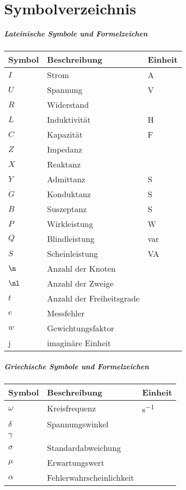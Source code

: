 \chapter*{Symbolverzeichnis}
{}%
%
\paragraph*{Lateinische Symbole und Formelzeichen}
\begin{tabularx}{\textwidth}{@{}l@{\qquad}X@{\quad}p{18mm}}
	Symbol	&	Beschreibung	&	Einheit\\\midrule
	$I$		&	Strom			&	\unit{A}\\
	$U$		&	Spannung		&	\unit{V}\\
	$R$		&	Widerstand		&	\unit{\Omega}\\
	$L$		&	Induktivität		&	\unit{H}\\
	$C$		&	Kapazität		&	\unit{F}\\
	$Z$		&	Impedanz		&	\unit{\Omega}\\
	$X$		&	Reaktanz			&	\unit{\Omega}\\
	$Y$		&	Admittanz		&	\unit{S}\\
	$G$		&	Konduktanz		&	\unit{S}\\
	$B$		&	Suszeptanz		&	\unit{S}\\
	$P$		&	Wirkleistung		&	\unit{W}\\
	$Q$		&	Blindleistung		&	\unit{var}\\
	$S$		&	Scheinleistung	&	\unit{VA}\\
	$\n$	&	Anzahl der Knoten	&	\\
	$\nl$	&	Anzahl der Zweige	&	\\
	$t$		&	Anzahl der Freiheitsgrade	&	\\
	$e$		&	Messfehler		&	\\
	$w$		&	Gewichtungsfaktor	&	\\
	j		&	imaginäre Einheit	&	\\
	
\end{tabularx}
%
\paragraph*{Griechische Symbole und Formelzeichen}
\begin{tabularx}{\textwidth}{@{}l@{\qquad}X@{\quad}p{18mm}}
	Symbol			&	Beschreibung				& Einheit\\\midrule
	$\omega$		&	Kreisfrequenz				&	\unit{s^{-1}}  \\
	$\delta$			&	Spannungswinkel			&	\\
	$\gamma$		&	\rf						&	\\
	$\sigma$			&	Standardabweichung		&	\\
	$\mu$			&	Erwartungswert			&	\\
	$\alpha$			&	Fehlerwahrscheinlichkeit	&	\\
	
\end{tabularx}
